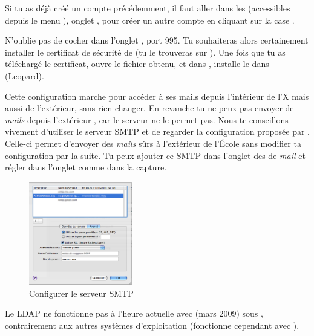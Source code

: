 Si tu as d\'ej\`a  cr\'e\'e un compte pr\'ec\'edemment, il faut aller dans les  (accessibles depuis le menu ), onglet , pour cr\'eer un autre compte en cliquant sur la case \menu{+}.

N'oublie pas de cocher  dans l'onglet , port 995. Tu souhaiteras alors certainement installer le certificat de s\'ecurit\'e de  (tu le trouveras sur ). Une fois que tu as t\'el\'echarg\'e le certificat, ouvre le fichier  obtenu, et dans , installe-le dans %
 (Leopard).

Cette configuration marche pour acc\'eder \`a  ses mails depuis l'int\'erieur de l'X mais aussi de l'ext\'erieur, sans rien changer. En revanche tu ne peux pas envoyer de \emph{mails} depuis l'ext\'erieur , car le serveur  ne le permet pas. Nous te conseillons vivement d'utiliser le serveur SMTP  et de regarder la configuration propos\'ee par . Celle-ci permet d'envoyer des \emph{mails} s\^urs \`a  l'ext\'erieur de l'\'Ecole sans modifier ta configuration par la suite. Tu peux ajouter ce SMTP dans l'onglet  des  de \emph{mail} et r\'egler dans l'onglet  comme dans la capture.

\begin{figure}[!hl]
    \begin{center}
	      \includegraphics[width=0.4\textwidth]{images/mac_config_smtp_poltechnique.png} 
      \caption{Configurer le serveur SMTP }
    \end{center}
  \end{figure}

Le LDAP ne fonctionne pas \`a  l'heure actuelle avec  (mars 2009) sous , contrairement aux  autres syst\`emes d'exploitation (fonctionne cependant avec ).

